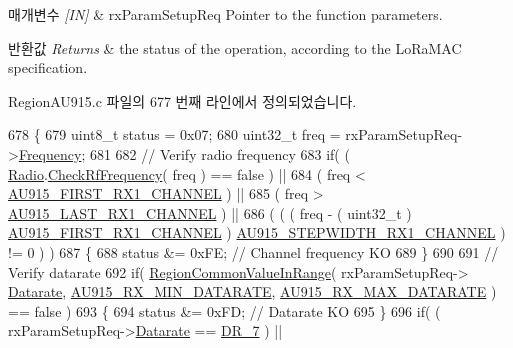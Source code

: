 \begin{DoxyParams}{매개변수}
{\em \mbox{[}\+I\+N\mbox{]}} & rx\+Param\+Setup\+Req Pointer to the function parameters.\\
\hline
\end{DoxyParams}

\begin{DoxyRetVals}{반환값}
{\em Returns} & the status of the operation, according to the Lo\+Ra\+M\+AC specification. \\
\hline
\end{DoxyRetVals}


Region\+A\+U915.\+c 파일의 677 번째 라인에서 정의되었습니다.


\begin{DoxyCode}
678 \{
679     uint8\_t status = 0x07;
680     uint32\_t freq = rxParamSetupReq->\mbox{\hyperlink{structs_rx_param_setup_req_params_ade3d190636488dad9a89b19446b7acf1}{Frequency}};
681 
682     \textcolor{comment}{// Verify radio frequency}
683     \textcolor{keywordflow}{if}( ( \mbox{\hyperlink{sx1276mb1las_8c_acf9fe61a72c16fa29a0dc449d23e3820}{Radio}}.\mbox{\hyperlink{struct_radio__s_a984f224d5ef26fb8a35f77d664f384df}{CheckRfFrequency}}( freq ) == false ) ||
684         ( freq < \mbox{\hyperlink{group___r_e_g_i_o_n_a_u915_ga006dab0130b61538f621e80e9f6028ce}{AU915\_FIRST\_RX1\_CHANNEL}} ) ||
685         ( freq > \mbox{\hyperlink{group___r_e_g_i_o_n_a_u915_gaa9d052a49ace8fc23a34e297449711be}{AU915\_LAST\_RX1\_CHANNEL}} ) ||
686         ( ( ( freq - ( uint32\_t ) \mbox{\hyperlink{group___r_e_g_i_o_n_a_u915_ga006dab0130b61538f621e80e9f6028ce}{AU915\_FIRST\_RX1\_CHANNEL}} ) %
      \mbox{\hyperlink{group___r_e_g_i_o_n_a_u915_gae66b13ecda158ed17cddb4ca5a9331f5}{AU915\_STEPWIDTH\_RX1\_CHANNEL}} ) != 0 ) )
687     \{
688         status &= 0xFE; \textcolor{comment}{// Channel frequency KO}
689     \}
690 
691     \textcolor{comment}{// Verify datarate}
692     \textcolor{keywordflow}{if}( \mbox{\hyperlink{group___r_e_g_i_o_n_c_o_m_m_o_n_gafdd1c80d953e18d755a631b72a9c3bd3}{RegionCommonValueInRange}}( rxParamSetupReq->
      \mbox{\hyperlink{structs_rx_param_setup_req_params_ae2f6080f3aa0e9485c55513ca56bb24d}{Datarate}}, \mbox{\hyperlink{group___r_e_g_i_o_n_a_u915_ga6c3e760e2bc555e4d608ff12d14f6652}{AU915\_RX\_MIN\_DATARATE}}, 
      \mbox{\hyperlink{group___r_e_g_i_o_n_a_u915_ga5ce832bce671573a6b6bb4a8358b250e}{AU915\_RX\_MAX\_DATARATE}} ) == false )
693     \{
694         status &= 0xFD; \textcolor{comment}{// Datarate KO}
695     \}
696     \textcolor{keywordflow}{if}( ( rxParamSetupReq->\mbox{\hyperlink{structs_rx_param_setup_req_params_ae2f6080f3aa0e9485c55513ca56bb24d}{Datarate}} == \mbox{\hyperlink{group___r_e_g_i_o_n_ga3a06805baf4f00911a3a5d3dbadebf61}{DR\_7}} ) ||

\end{DoxyCode}
